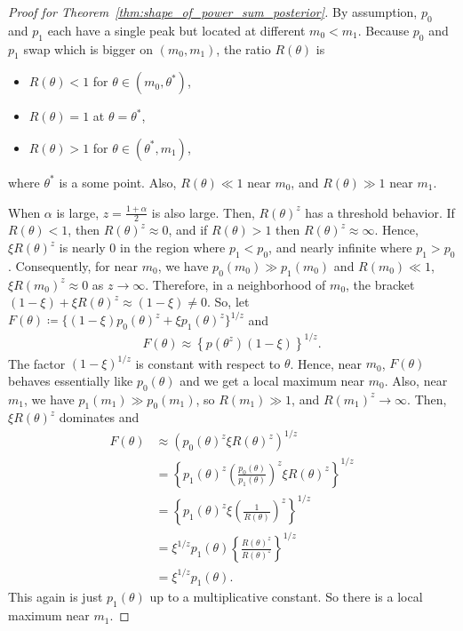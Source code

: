 \documentclass[12pt]{article}
\begin{document}
\begin{proof}[Proof for Theorem~\ref{thm:shape_of_power_sum_posterior}]
    By assumption, $p_0$ and $p_1$ each have a single peak but located at different $m_0 < m_1$.
    Because $p_0$ and $p_1$ swap which is bigger on $(m_0, m_1)$, the ratio $R(\theta)$ is
    \begin{itemize}
        \item $R(\theta) < 1$ for $\theta \in (m_0, \theta^*)$,
        \item $R(\theta) = 1$ at $\theta = \theta^*$,
        \item $R(\theta) > 1$ for $\theta \in (\theta^*, m_1)$,
    \end{itemize}
    where $\theta^*$ is a some point.
    Also, $R(\theta) \ll 1$ near $m_0$, and $R(\theta) \gg 1$ near $m_1$.

    When $\alpha$ is large, $z = \frac{1 + \alpha}{2}$ is also large.
    Then, $R(\theta)^z$ has a threshold behavior.
    If $R(\theta) < 1$, then $R(\theta)^z \approx 0$, and if $R(\theta) > 1$ then $R(\theta)^z \approx \infty$.
    Hence, $\xi R(\theta)^z$ is nearly $0$ in the region where $p_1 < p_0$, and nearly infinite where $p_1 > p_0$.
    Consequently, for near $m_0$, we have $p_0(m_0) \gg p_1(m_0)$ and $R(m_0) \ll 1$, $\xi R(m_0)^z \approx 0$ as $z \to \infty$.
    Therefore, in a neighborhood of $m_0$, the bracket $(1 - \xi) + \xi R(\theta)^z \approx (1 - \xi) \neq 0$.
    So, let $F(\theta) \coloneqq \{(1 - \xi)p_0(\theta)^z + \xi p_1(\theta)^z \}^{1/z}$ and
    \begin{align*}
        F(\theta) \approx \left\{p(\theta^z)(1 - \xi)\right\}^{1/z}.
    \end{align*}
    The factor $(1 - \xi)^{1/z}$ is constant with respect to $\theta$.
    Hence, near $m_0$, $F(\theta)$ behaves essentially like $p_0(\theta)$ and we get a local maximum near $m_0$.
    Also, near $m_1$, we have $p_1(m_1) \gg p_0(m_1)$, so $R(m_1) \gg 1$, and $R(m_1)^z \to \infty$.
    Then, $\xi R(\theta)^z$ dominates and
    \begin{align*}
        F(\theta) &\approx \left(p_0(\theta)^z \xi R(\theta)^z\right)^{1/z} \\
        &= \left\{p_1(\theta)^z \left(\frac{p_0(\theta)}{p_1(\theta)}\right)^z \xi R(\theta)^z \right\}^{1/z} \\
        &= \left\{p_1(\theta)^z \xi \left(\frac{1}{R(\theta)}\right)^z\right\}^{1/z} \\
        &= \xi^{1/z}p_1(\theta)\left\{\frac{R(\theta)^z}{R(\theta)^z}\right\}^{1/z} \\
        &= \xi^{1/z} p_1(\theta).
    \end{align*}
    This again is just $p_1(\theta)$ up to a multiplicative constant.
    So there is a local maximum near $m_1$.


\end{proof}
\end{document}
